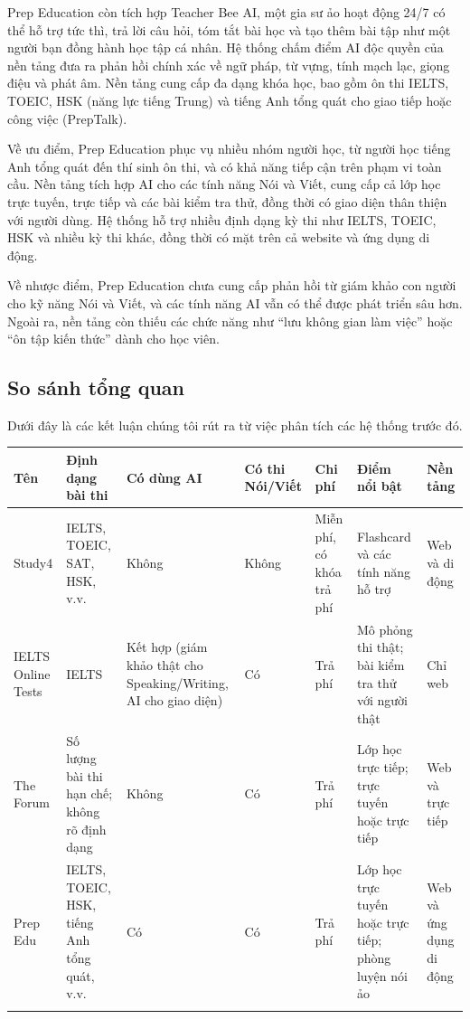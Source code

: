 Prep Education còn tích hợp Teacher Bee AI, một gia sư ảo hoạt động 24/7 có thể hỗ trợ tức thì, trả lời câu hỏi, tóm tắt bài học và tạo thêm bài tập như một người bạn đồng hành học tập cá nhân. Hệ thống chấm điểm AI độc quyền của nền tảng đưa ra phản hồi chính xác về ngữ pháp, từ vựng, tính mạch lạc, giọng điệu và phát âm. Nền tảng cung cấp đa dạng khóa học, bao gồm ôn thi IELTS, TOEIC, HSK (năng lực tiếng Trung) và tiếng Anh tổng quát cho giao tiếp hoặc công việc (PrepTalk).

Về ưu điểm, Prep Education phục vụ nhiều nhóm người học, từ người học tiếng Anh tổng quát đến thí sinh ôn thi, và có khả năng tiếp cận trên phạm vi toàn cầu. Nền tảng tích hợp AI cho các tính năng Nói và Viết, cung cấp cả lớp học trực tuyến, trực tiếp và các bài kiểm tra thử, đồng thời có giao diện thân thiện với người dùng. Hệ thống hỗ trợ nhiều định dạng kỳ thi như IELTS, TOEIC, HSK và nhiều kỳ thi khác, đồng thời có mặt trên cả website và ứng dụng di động.

Về nhược điểm, Prep Education chưa cung cấp phản hồi từ giám khảo con người cho kỹ năng Nói và Viết, và các tính năng AI vẫn có thể được phát triển sâu hơn. Ngoài ra, nền tảng còn thiếu các chức năng như “lưu không gian làm việc” hoặc “ôn tập kiến thức” dành cho học viên.

\subsection{So sánh tổng quan}

Dưới đây là các kết luận chúng tôi rút ra từ việc phân tích các hệ thống trước đó.

{
\scriptsize
\setlength{\tabcolsep}{3pt}
\renewcommand{\arraystretch}{1.5}

\begin{tabularx}{\textwidth}{|>{\raggedright\arraybackslash}X|>{\raggedright\arraybackslash}X|>{\raggedright\arraybackslash}X|>{\raggedright\arraybackslash}X|>{\raggedright\arraybackslash}X|>{\raggedright\arraybackslash}X|>{\raggedright\arraybackslash}X|}
\hline
\textbf{Tên} & \textbf{Định dạng bài thi} & \textbf{Có dùng AI} & \textbf{Có thi Nói/Viết} & \textbf{Chi phí} & \textbf{Điểm nổi bật} & \textbf{Nền tảng} \\
\hline
Study4 & IELTS, TOEIC, SAT, HSK, v.v. & Không & Không & Miễn phí, có khóa trả phí & Flashcard và các tính năng hỗ trợ & Web và di động \\
\hline
IELTS Online Tests & IELTS & Kết hợp (giám khảo thật cho Speaking/Writing, AI cho giao diện) & Có & Trả phí & Mô phỏng thi thật; bài kiểm tra thử với người thật & Chỉ web \\
\hline
The Forum & Số lượng bài thi hạn chế; không rõ định dạng & Không & Có & Trả phí & Lớp học trực tiếp; trực tuyến hoặc trực tiếp & Web và trực tiếp \\
\hline
Prep Edu & IELTS, TOEIC, HSK, tiếng Anh tổng quát, v.v. & Có & Có & Trả phí & Lớp học trực tuyến hoặc trực tiếp; phòng luyện nói ảo & Web và ứng dụng di động \\
\hline
\caption{So sánh các nền tảng ôn thi tiếng Anh}
\end{tabularx}

}


